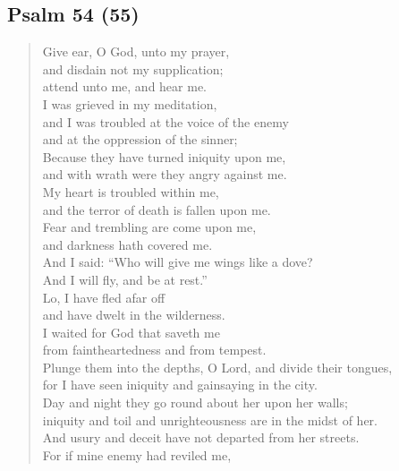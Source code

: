 {		\subsection*{Psalm 54 (55)}
			\begin{verse}
				Give ear, O God, unto my prayer,\nolinebreak\\
				and disdain not my supplication;\nolinebreak\\
				attend unto me, and hear me.\nolinebreak\\
				I was grieved in my meditation,\nolinebreak\\
				and I was troubled at the voice of the enemy\nolinebreak\\
				and at the oppression of the sinner;\nolinebreak\\
				Because they have turned iniquity upon me,\nolinebreak\\
				and with wrath were they angry against me.\nolinebreak\\
				My heart is troubled within me,\nolinebreak\\
				and the terror of death is fallen upon me.\nolinebreak\\
				Fear and trembling are come upon me,\nolinebreak\\
				and darkness hath covered me.\nolinebreak\\
				And I said: ``Who will give me wings like a dove?\nolinebreak\\
				And I will fly, and be at rest.''\nolinebreak\\
				Lo, I have fled afar off\nolinebreak\\
				and have dwelt in the wilderness.\nolinebreak\\
				I waited for God that saveth me\nolinebreak\\
				from faintheartedness and from tempest.\nolinebreak\\
				Plunge them into the depths, O Lord, and divide their tongues,\nolinebreak\\
				for I have seen iniquity and gainsaying in the city.\nolinebreak\\
				Day and night they go round about her upon her walls;\nolinebreak\\
				iniquity and toil and unrighteousness are in the midst of her.\nolinebreak\\
				And usury and deceit have not departed from her streets.\nolinebreak\\
				For if mine enemy had reviled me,\nolinebreak\\

\end{verse}}
